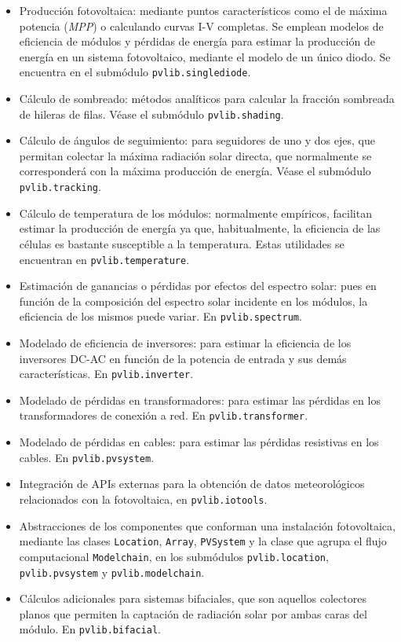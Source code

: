 \begin{itemize}
    \item Producción fotovoltaica: mediante puntos característicos como el de máxima potencia (\textit{MPP}) o calculando curvas I-V completas. Se emplean modelos de eficiencia de módulos y pérdidas de energía para estimar la producción de energía en un sistema fotovoltaico, mediante el modelo de un único diodo. Se encuentra en el submódulo \texttt{pvlib.singlediode}.
    \item Cálculo de sombreado: métodos analíticos para calcular la fracción sombreada de hileras de filas. Véase el submódulo \texttt{pvlib.shading}.
    \item Cálculo de ángulos de seguimiento: para seguidores de uno y dos ejes, que permitan colectar la máxima radiación solar directa, que normalmente se corresponderá con la máxima producción de energía. Véase el submódulo \texttt{pvlib.tracking}.
    \item Cálculo de temperatura de los módulos: normalmente empíricos, facilitan estimar la producción de energía ya que, habitualmente, la eficiencia de las células es bastante susceptible a la temperatura. Estas utilidades se encuentran en \texttt{pvlib.temperature}.
    \item Estimación de ganancias o pérdidas por efectos del espectro solar: pues en función de la composición del espectro solar incidente en los módulos, la eficiencia de los mismos puede variar. En \texttt{pvlib.spectrum}.
    \item Modelado de eficiencia de inversores: para estimar la eficiencia de los inversores DC-AC en función de la potencia de entrada y sus demás características. En \texttt{pvlib.inverter}.
    \item Modelado de pérdidas en transformadores: para estimar las pérdidas en los transformadores de conexión a red. En \texttt{pvlib.transformer}.
    \item Modelado de pérdidas en cables: para estimar las pérdidas resistivas en los cables. En \texttt{pvlib.pvsystem}.
    \item Integración de APIs externas para la obtención de datos meteorológicos relacionados con la fotovoltaica, en \texttt{pvlib.iotools}.
    \item Abstracciones de los componentes que conforman una instalación fotovoltaica, mediante las clases \texttt{Location}, \texttt{Array}, \texttt{PVSystem} y la clase que agrupa el flujo computacional \texttt{Modelchain}, en los submódulos \texttt{pvlib.location}, \texttt{pvlib.pvsystem} y \texttt{pvlib.modelchain}.
    \item Cálculos adicionales para sistemas bifaciales, que son aquellos colectores planos que permiten la captación de radiación solar por ambas caras del módulo. En \texttt{pvlib.bifacial}.

\end{itemize}

